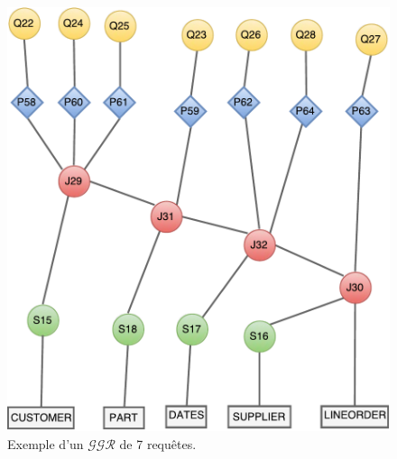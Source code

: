 \begin{example}\label{subsec:MotivatingExample}
	\begin{figure}
	\centering
	\includegraphics[scale=0.46]{chapitre6/chap6Fig/component.pdf}
	\caption{Exemple d'un $\mathcal{GGR}$ de 7 requêtes.}
	\label{fig:mvpp-component}
\end{figure}


\end{example}
